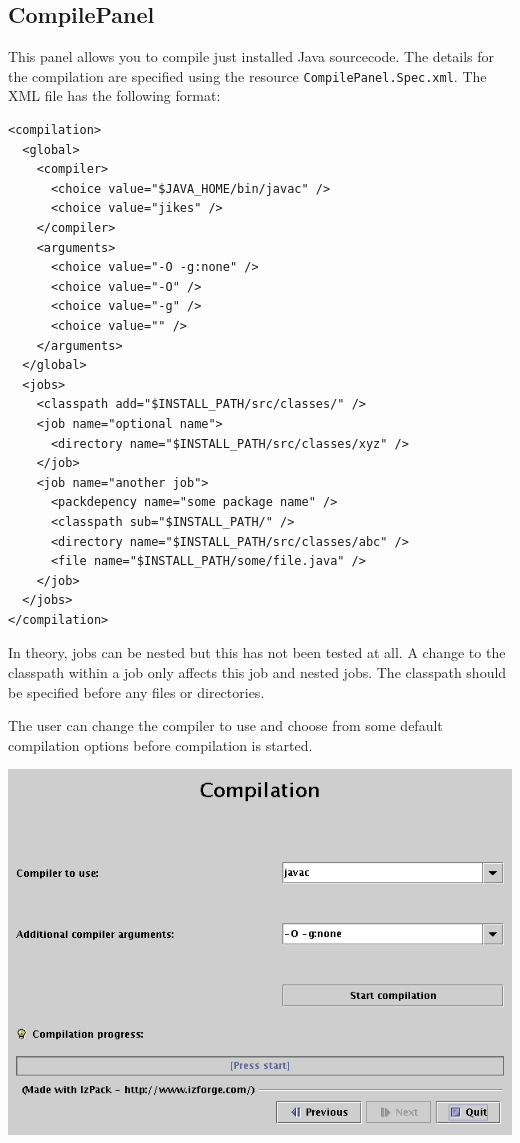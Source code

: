 \subsection{CompilePanel}

This panel allows you to compile just installed Java sourcecode. 
The details for the compilation are specified using the resource \texttt{CompilePanel.Spec.xml}.
The XML file has the following format:
\begin{verbatim}
<compilation>
  <global>
    <compiler>
      <choice value="$JAVA_HOME/bin/javac" />
      <choice value="jikes" />
    </compiler>
    <arguments>
      <choice value="-O -g:none" />
      <choice value="-O" />
      <choice value="-g" />
      <choice value="" />
    </arguments>
  </global>
  <jobs>
    <classpath add="$INSTALL_PATH/src/classes/" />
    <job name="optional name">
      <directory name="$INSTALL_PATH/src/classes/xyz" />
    </job>
    <job name="another job">
      <packdepency name="some package name" />
      <classpath sub="$INSTALL_PATH/" />
      <directory name="$INSTALL_PATH/src/classes/abc" />
      <file name="$INSTALL_PATH/some/file.java" />
    </job>
  </jobs>
</compilation>
\end{verbatim}

In theory, jobs can be nested but this has not been tested at all. A change to
the classpath within a job only affects this job and nested jobs. The classpath
should be specified before any files or directories.

The user can change the compiler to use and choose from some default
compilation options before compilation is started. 

\includegraphics[width=\linewidth]{img/compilePanel}

